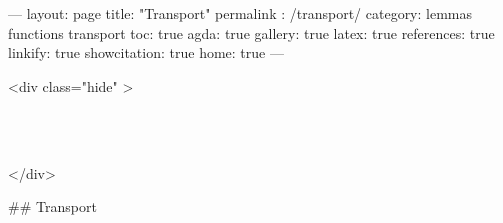 ---
layout: page
title: "Transport"
permalink : /transport/
category: lemmas functions transport
toc: true
agda: true
gallery: true
latex: true
references: true
linkify: true
showcitation: true
home: true
---

<div class="hide" >
\begin{code}%
\>[0]\AgdaSymbol{\{-\#}\AgdaSpace{}%
\AgdaSpace{}%
\AgdaSpace{}%
\AgdaSymbol{\#-\}}\<%
\\
\>[0]\AgdaSpace{}%
\AgdaSpace{}%
\AgdaSpace{}%
\<%
\\
\>[0]\AgdaSpace{}%
\AgdaSpace{}%
\AgdaSpace{}%
\<%
\end{code}
</div>

## Transport

